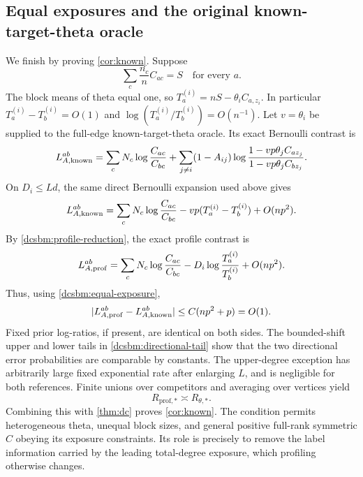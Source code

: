 \subsection{Equal exposures and the original known-target-theta oracle}

We finish by proving \cref{cor:known}.  Suppose
\begin{equation}
 \sum_c\frac{n_c}{n}C_{ac}=S
 \quad\text{for every }a.
 \label{dcsbm:equal-exposure}
\end{equation}
The block means of theta equal one, so
\(
 T_a^{(i)}=nS-\theta_iC_{a,z_i}
\).
In particular \(T_a^{(i)}-T_b^{(i)}=O(1)\) and
\(\log(T_a^{(i)}/T_b^{(i)})=O(n^{-1})\).
Let \(v=\theta_i\) be supplied to the full-edge
known-target-theta oracle.  Its exact Bernoulli contrast is
\[
 L^{ab}_{A,\rm known}
 =\sum_cN_c\log\frac{C_{ac}}{C_{bc}}
  +\sum_{j\ne i}(1-A_{ij})
       \log\frac{1-vp\theta_jC_{az_j}}
                 {1-vp\theta_jC_{bz_j}} .
\]
On \(D_i\le Ld\), the same direct Bernoulli expansion used above
gives
\[
 L^{ab}_{A,\rm known}
 =\sum_cN_c\log\frac{C_{ac}}{C_{bc}}
   -vp(T_a^{(i)}-T_b^{(i)})+O(np^2).
\]
By \cref{dcsbm:profile-reduction}, the exact profile contrast is
\[
 L^{ab}_{A,\rm prof}
 =\sum_cN_c\log\frac{C_{ac}}{C_{bc}}
    -D_i\log\frac{T_a^{(i)}}{T_b^{(i)}}+O(np^2).
\]
Thus, using \cref{dcsbm:equal-exposure},
\begin{equation}
 |L^{ab}_{A,\rm prof}-L^{ab}_{A,\rm known}|
 \le C(np^2+p)=O(1).
 \label{dcsbm:known-comparison}
\end{equation}
Fixed prior log-ratios, if present, are identical on both sides.
The bounded-shift upper and lower tails in
\cref{dcsbm:directional-tail} show that the two directional
error probabilities are comparable by constants.
The upper-degree exception has arbitrarily large fixed
exponential rate after enlarging \(L\), and is negligible for
both references.  Finite unions over competitors and averaging
over vertices yield
\[
 R_{\mathrm{prof},*}\asymp R_{\theta,*}.
\]
Combining this with \cref{thm:dc} proves \cref{cor:known}.
The condition permits heterogeneous theta, unequal block sizes,
and general positive full-rank symmetric \(C\) obeying its exposure
constraints.  Its role is precisely to remove the label information
carried by the leading total-degree exposure, which profiling
otherwise changes.


